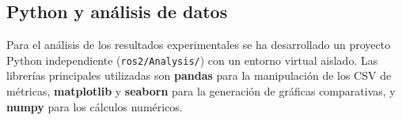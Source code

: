 \subsection{Python y análisis de datos}

Para el análisis de los resultados experimentales se ha desarrollado un proyecto Python independiente (\texttt{ros2/Analysis/}) con un entorno virtual aislado. Las librerías principales utilizadas son \textbf{pandas} para la manipulación de los CSV de métricas, \textbf{matplotlib} y \textbf{seaborn} para la generación de gráficas comparativas, y \textbf{numpy} para los cálculos numéricos.
